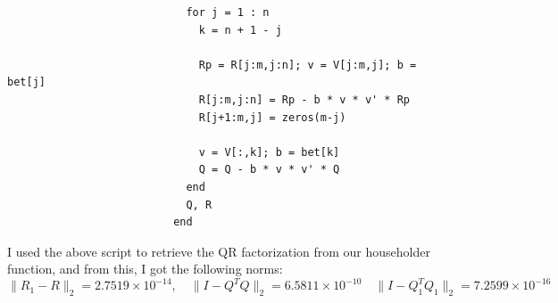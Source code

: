 \documentclass[11pt]{article}
\begin{document}
\begin{enumerate}
\begin{verbatim}
                            for j = 1 : n
                              k = n + 1 - j
                          
                              Rp = R[j:m,j:n]; v = V[j:m,j]; b = bet[j]
                              R[j:m,j:n] = Rp - b * v * v' * Rp
                              R[j+1:m,j] = zeros(m-j)
                          
                              v = V[:,k]; b = bet[k]
                              Q = Q - b * v * v' * Q
                            end
                            Q, R
                          end
\end{verbatim}
    I used the above script to retrieve the QR factorization from our householder function, and from this, I got the following norms:
    \[\lVert R_1 - R \rVert_2 = 2.7519 \times 10^{-14}, \quad \lVert I - Q^T Q \rVert_2 = 6.5811 \times 10^{-10} \quad \lVert I - Q_1^T Q_1 \rVert_2 = 7.2599 \times 10^{-16}\]
\end{enumerate}
\end{document}
